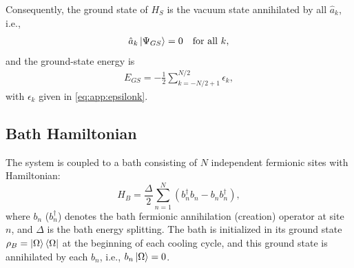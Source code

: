 Consequently, the ground state of $H_S$ is the vacuum state annihilated by all $\hat{a}_k$, i.e.,
\begin{align}
    \hat{a}_k\ket{\Psi_{GS}}=0
    \quad
    \text{for all }
    k,
\end{align}
and the ground-state energy is
\begin{align}
    E_{GS} = - \frac{1}{2}
    \sum_{k=-N/2+1}^{N/2}
    \epsilon_k,
\end{align}
with $\epsilon_k$ given in \cref{eq:app:epsilonk}.

\subsection{Bath Hamiltonian}

The system is coupled to a bath consisting of $N$ independent fermionic sites with Hamiltonian:
\begin{equation}
    H_B = \frac{\Delta}{2}\sum_{n=1}^N \left(b_n^\dagger b_n - b_n b_n^\dagger\right),
    \label{eq:bath-hamiltonian}
\end{equation}
where $b_n$ ($b_n^\dagger$) denotes the bath fermionic annihilation (creation) operator at site $n$, and $\Delta$ is the bath energy splitting. The bath is initialized in its ground state $\rho_B = \ket{\Omega}\bra{\Omega}$ at the beginning of each cooling cycle, and this ground state is annihilated by each $b_n$, i.e., $b_n\ket{\Omega}=0$.

